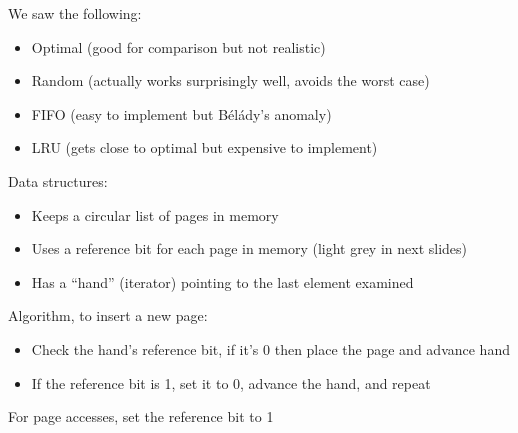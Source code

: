   \begin{slide}


    We saw the following:
    \begin{itemize}
      \item Optimal (good for comparison but not realistic)
      \item Random (actually works surprisingly well, avoids the worst case)
      \item FIFO (easy to implement but Bélády's anomaly)
      \item LRU (gets close to optimal but expensive to implement)
    \end{itemize}

  \end{slide}

  \begin{slide}


    Data structures:
    \begin{itemize}
      \item Keeps a circular list of pages in memory
      \item Uses a reference bit for each page in memory (light grey in next slides)
      \item Has a ``hand'' (iterator) pointing to the last element examined
    \end{itemize}
    \medskip

    Algorithm, to insert a new page:
    \begin{itemize}
      \item Check the hand's reference bit, if it's 0 then place the page and advance hand
      \item If the reference bit is 1, set it to 0, advance the hand, and repeat
    \end{itemize}
    \medskip

    For page accesses, set the reference bit to 1

  \end{slide}


